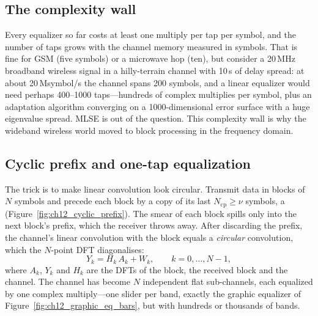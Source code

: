 \subsection{The complexity wall}

Every equalizer so far costs at least one multiply per tap per symbol, and the number of taps grows
with the channel memory measured in symbols. That is fine for GSM (five symbols) or a microwave hop
(ten), but consider a 20\,MHz broadband wireless signal in a hilly-terrain channel with 10\,\textmu s
of delay spread: at about 20\,Msymbol/s the channel spans 200 symbols, and a linear equalizer would
need perhaps 400--1000 taps---hundreds of complex multiplies per symbol, plus an adaptation
algorithm converging on a 1000-dimensional error surface with a huge eigenvalue spread. MLSE is out
of the question. This complexity wall is why the wideband wireless world moved to block processing
in the frequency domain.

\subsection{Cyclic prefix and one-tap equalization}

The trick is to make linear convolution look circular. Transmit data in blocks of $N$ symbols and
precede each block by a copy of its last $N_{\mathrm{cp}}\ge\nu$ symbols, a 
(Figure~\ref{fig:ch12_cyclic_prefix}). The smear of each block spills only into the next block's
prefix, which the receiver throws away. After discarding the prefix, the channel's linear
convolution with the block equals a \emph{circular} convolution, which the $N$-point DFT
diagonalises:
\begin{equation}
Y_k=H_k\,A_k+W_k,\qquad k=0,\dots,N-1,
\end{equation}
where $A_k$, $Y_k$ and $H_k$ are the DFTs of the block, the received block and the channel. The
channel has become $N$ independent flat sub-channels, each equalized by one complex multiply---one
slider per band, exactly the graphic equalizer of Figure~\ref{fig:ch12_graphic_eq_bars}, but with
hundreds or thousands of bands.


